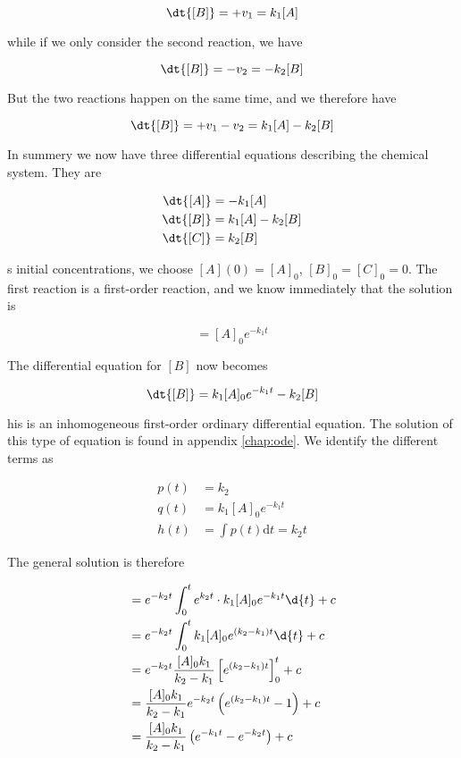 \begin{equation}
    \dt{[B]} = +v_1 = k_1[A]
\end{equation}

while if we only consider the second reaction, we have

\begin{equation}
    \dt{[B]} = -v_2 = -k_2[B]
\end{equation}

But the two reactions happen on the same time, and we therefore have

\begin{equation}
    \dt{[B]} = +v_1 - v_2 = k_1[A] - k_2[B]
\end{equation}

In summery we now have three differential equations describing the chemical system. They are

\begin{align*}
    \dt{[A]} &= -k_1[A] \\
    \dt{[B]} &= k_1[A] - k_2[B] \\
    \dt{[C]} &= k_2[B]
\end{align*}

s initial concentrations, we choose $[A](0) = [A]_0$, $[B]_0 = [C]_0 = 0$. The first reaction is a first-order reaction, and we know immediately that the solution is

\begin{equation}
    [A] = [A]_0e^{-k_1t}
\end{equation}

The differential equation for $[B]$ now becomes

\begin{equation}
    \dt{[B]} = k_1[A]_0e^{-k_1t} - k_2[B]
\end{equation}

his is an inhomogeneous first-order ordinary differential equation. The solution of this type of equation is found in appendix \ref{chap:ode}. We identify the different terms as

\begin{align*}
    p(t) &= k_2 \\
    q(t) &= k_1[A]_0e^{-k_1t} \\
    h(t) &= \int p(t) \mathrm{d}t = k_2 t
\end{align*}

The general solution is therefore

\begin{align}
    [B] &= e^{-k_2t} \int_0^t e^{k_2t} \cdot k_1[A]_0e^{-k_1t}\d{t} + c \nonumber \\
        &= e^{-k_2t} \int_0^t k_1[A]_0e^{(k_2-k_1)t}\d{t} + c \nonumber \\
        &= e^{-k_2t}\frac{[A]_0k_1}{k_2-k_1}\left[ e^{(k_2-k_1)t} \right]_0^t + c \nonumber \\
        &= \frac{[A]_0k_1}{k_2-k_1}e^{-k_2t} \left( e^{(k_2-k_1)t} - 1 \right) + c \nonumber \\
        &= \frac{[A]_0k_1}{k_2-k_1} \left( e^{-k_1t} - e^{-k_2 t} \right) + c \label{eq:TwoFirstOrderSolution}
\end{align}

